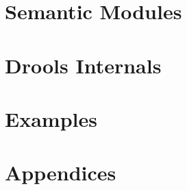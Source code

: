 \documentclass[10pt,oneside,letterpaper,colorhighlight]{book}
\begin{document}
\part{Semantic Modules}





\part{Drools Internals}





\part{Examples}


\part{Appendices}
\appendix






\backmatter




{\footnotesize
\pagestyle{plain}
\printindex
}

%
\end{document}
